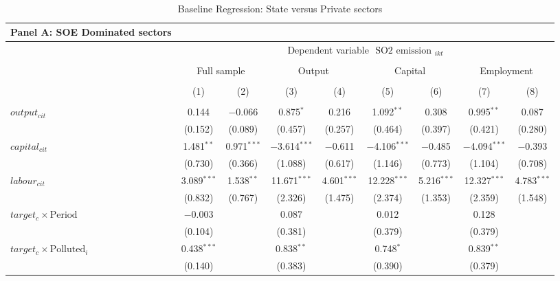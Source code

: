 \documentclass[12pt]{article}
\begin{document}
\begin{table}[!htb] \centering
    \caption{\\ 
    Baseline Regression: State versus Private sectors}
      \begin{adjustbox}{width=\textwidth, totalheight=\baselineskip,keepaspectratio}
     \label{table_5}
      \begin{tabular}{@{\extracolsep{5pt}}lcccccccc} 
        \multicolumn{1}{l}{\textbf{Panel A: SOE Dominated sectors}} \\
        \toprule
        & \multicolumn{8}{c}{Dependent variable $\text { SO2 emission }_{i k t}$} \\ 
        \cline{2-9}
            
\\[-1.8ex]
            &\multicolumn{2}{c}{Full sample}&\multicolumn{2}{c}{Output}&\multicolumn{2}{c}{Capital}&\multicolumn{2}{c}{Employment}\\
\\[-1.8ex] & (1) & (2) & (3) & (4) & (5) & (6) & (7) & (8)\\ 
\hline \\[-1.8ex] 
 $output_{cit}$ & 0.144 & $-$0.066 & 0.875$^{*}$ & 0.216 & 1.092$^{**}$ & 0.308 & 0.995$^{**}$ & 0.087 \\ 
  & (0.152) & (0.089) & (0.457) & (0.257) & (0.464) & (0.397) & (0.421) & (0.280) \\ 
  $capital_{cit}$ & 1.481$^{**}$ & 0.971$^{***}$ & $-$3.614$^{***}$ & $-$0.611 & $-$4.106$^{***}$ & $-$0.485 & $-$4.094$^{***}$ & $-$0.393 \\ 
  & (0.730) & (0.366) & (1.088) & (0.617) & (1.146) & (0.773) & (1.104) & (0.708) \\ 
  $labour_{cit}$ & 3.089$^{***}$ & 1.538$^{**}$ & 11.671$^{***}$ & 4.601$^{***}$ & 12.228$^{***}$ & 5.216$^{***}$ & 12.327$^{***}$ & 4.783$^{***}$ \\ 
  & (0.832) & (0.767) & (2.326) & (1.475) & (2.374) & (1.353) & (2.359) & (1.548) \\ 
   $target_c \times \text{Period}$  & $-$0.003 &  & 0.087 &  & 0.012 &  & 0.128 &  \\ 
  & (0.104) &   & (0.381) &   & (0.379) &   & (0.379) &   \\ 
   $target_c \times \text{Polluted}_i$  & 0.438$^{***}$ &  & 0.838$^{**}$ &  & 0.748$^{*}$ &  & 0.839$^{**}$ &  \\ 
  & (0.140) &   & (0.383) &   & (0.390) &   & (0.379) &   \\ 

\end{tabular}
\end{adjustbox}
\end{table}
\end{document}
